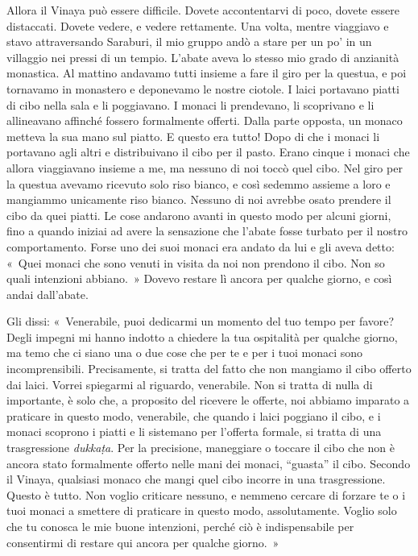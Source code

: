 Allora il Vinaya può essere difficile. Dovete accontentarvi di poco,
dovete essere distaccati. Dovete vedere, e vedere rettamente. Una volta,
mentre viaggiavo e stavo attraversando Saraburi, il mio gruppo andò a
stare per un po' in un villaggio nei pressi di un tempio. L'abate aveva
lo stesso mio grado di anzianità monastica. Al mattino andavamo tutti
insieme a fare il giro per la questua, e poi tornavamo in monastero e
deponevamo le nostre ciotole. I laici portavano piatti di cibo nella
sala e li poggiavano. I monaci li prendevano, li scoprivano e li
allineavano affinché fossero formalmente offerti. Dalla parte opposta,
un monaco metteva la sua mano sul piatto. E questo era tutto! Dopo di
che i monaci li portavano agli altri e distribuivano il cibo per il
pasto. Erano cinque i monaci che allora viaggiavano insieme a me, ma
nessuno di noi toccò quel cibo. Nel giro per la questua avevamo ricevuto
solo riso bianco, e così sedemmo assieme a loro e mangiammo unicamente
riso bianco. Nessuno di noi avrebbe osato prendere il cibo da quei
piatti. Le cose andarono avanti in questo modo per alcuni giorni, fino a
quando iniziai ad avere la sensazione che l'abate fosse turbato per il
nostro comportamento. Forse uno dei suoi monaci era andato da lui e gli
aveva detto: «~Quei monaci che sono venuti in visita da noi non prendono
il cibo. Non so quali intenzioni abbiano.~» Dovevo restare lì ancora per
qualche giorno, e così andai dall'abate.

Gli dissi: «~Venerabile, puoi dedicarmi un momento del tuo tempo per
favore? Degli impegni mi hanno indotto a chiedere la tua ospitalità per
qualche giorno, ma temo che ci siano una o due cose che per te e per i
tuoi monaci sono incomprensibili. Precisamente, si tratta del fatto che
non mangiamo il cibo offerto dai laici. Vorrei spiegarmi al riguardo,
venerabile. Non si tratta di nulla di importante, è solo che, a
proposito del ricevere le offerte, noi abbiamo imparato a praticare in
questo modo, venerabile, che quando i laici poggiano il cibo, e i monaci
scoprono i piatti e li sistemano per l'offerta formale, si tratta di una
trasgressione \emph{dukkaṭa}. Per la precisione, maneggiare o toccare il
cibo che non è ancora stato formalmente offerto nelle mani dei monaci,
``guasta'' il cibo. Secondo il Vinaya, qualsiasi monaco che mangi quel
cibo incorre in una trasgressione. Questo è tutto. Non voglio criticare
nessuno, e nemmeno cercare di forzare te o i tuoi monaci a smettere di
praticare in questo modo, assolutamente. Voglio solo che tu conosca le
mie buone intenzioni, perché ciò è indispensabile per consentirmi di
restare qui ancora per qualche giorno.~»

